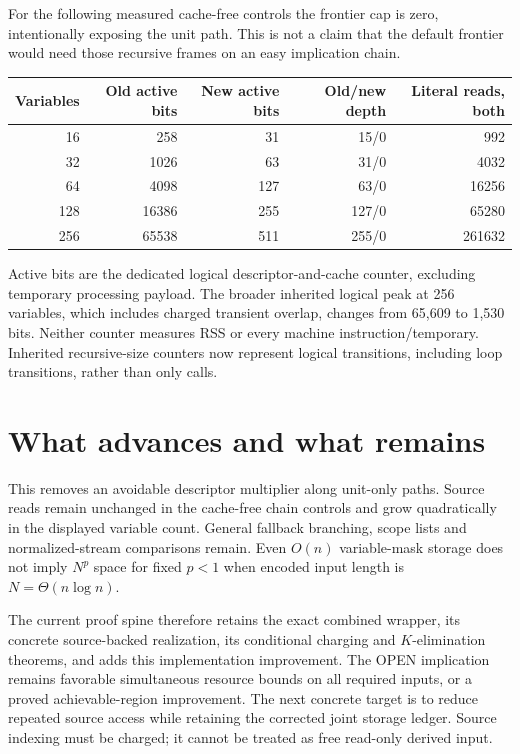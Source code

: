 \documentclass[11pt]{article}
\begin{document}
For the following measured cache-free controls the frontier cap is zero,
intentionally exposing the unit path. This is not a claim that the default
frontier would need those recursive frames on an easy implication chain.
\begin{center}
\begin{tabular}{rrrrr}
\toprule
Variables & Old active bits & New active bits & Old/new depth & Literal reads, both\\
\midrule
16 & 258 & 31 & 15/0 & 992\\
32 & 1026 & 63 & 31/0 & 4032\\
64 & 4098 & 127 & 63/0 & 16256\\
128 & 16386 & 255 & 127/0 & 65280\\
256 & 65538 & 511 & 255/0 & 261632\\
\bottomrule
\end{tabular}
\end{center}
Active bits are the dedicated logical descriptor-and-cache counter,
excluding temporary processing payload. The broader inherited logical
peak at 256 variables, which includes charged transient overlap, changes
from 65,609 to 1,530 bits. Neither counter measures RSS or every machine
instruction/temporary. Inherited recursive-size counters now represent
logical transitions, including loop transitions, rather than only calls.

\section{What advances and what remains}
This removes an avoidable descriptor multiplier along unit-only paths.
Source reads remain unchanged in the cache-free chain controls and grow
quadratically in the displayed variable count. General fallback branching,
scope lists and normalized-stream comparisons remain.
Even $O(n)$ variable-mask storage does not imply $N^p$ space for fixed $p<1$
when encoded input length is $N=\Theta(n\log n)$.

The current proof spine therefore retains the exact combined wrapper,
its concrete source-backed realization, its conditional charging and
$K$-elimination theorems, and adds this implementation improvement.
The OPEN implication remains favorable simultaneous resource bounds on
all required inputs, or a proved achievable-region improvement.
The next concrete target is to reduce repeated source access while retaining
the corrected joint storage ledger. Source indexing must be charged; it
cannot be treated as free read-only derived input.
\end{document}
